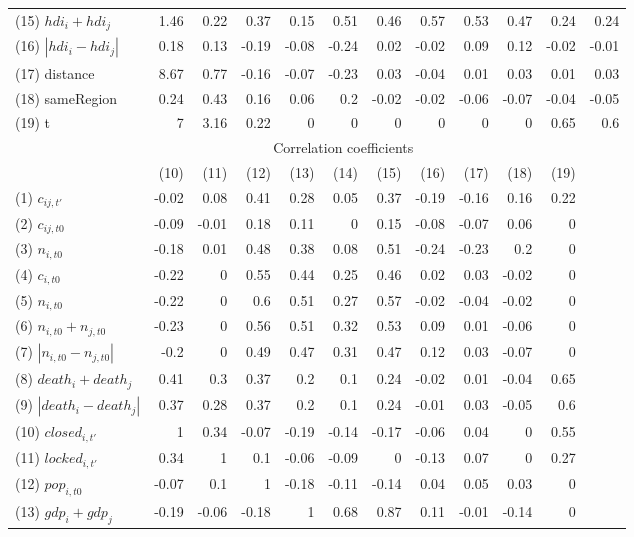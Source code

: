 \begin{landscape}
\begin{table}[ht]
\begin{threeparttable}
\begin{small}
\begin{tabular}{lrrrrrrrrrrr}
(15)	$hdi_i+hdi_j$	&	1.46	&	0.22	&	0.37	&	0.15	&	0.51	&	0.46	&	0.57	&	0.53	&	0.47	&	0.24	&	0.24	\\
(16)	$|hdi_i-hdi_j|$	&	0.18	&	0.13	&	-0.19	&	-0.08	&	-0.24	&	0.02	&	-0.02	&	0.09	&	0.12	&	-0.02	&	-0.01	\\
(17)	distance	&	8.67	&	0.77	&	-0.16	&	-0.07	&	-0.23	&	0.03	&	-0.04	&	0.01	&	0.03	&	0.01	&	0.03	\\
(18)	sameRegion	&	0.24	&	0.43	&	0.16	&	0.06	&	0.2	&	-0.02	&	-0.02	&	-0.06	&	-0.07	&	-0.04	&	-0.05	\\
(19)	t	&	7	&	3.16	&	0.22	&	0	&	0	&	0	&	0	&	0	&	0	&	0.65	&	0.6	\\
\noalign{\smallskip}\hline\noalign{\smallskip}
   & \multicolumn{9}{c}{Correlation coefficients}  \\ 
\noalign{\smallskip}\hline\noalign{\smallskip}
		&	(10)	&	(11)	&	(12)	&	(13)	&	(14)	&	(15)	&	(16)	&	(17)	&	(18)	&	(19)	\\
(1)	$c_{ij,t'}$	&	-0.02	&	0.08	&	0.41	&	0.28	&	0.05	&	0.37	&	-0.19	&	-0.16	&	0.16	&	0.22	\\
(2)	$c_{ij,t0}$	&	-0.09	&	-0.01	&	0.18	&	0.11	&	0	&	0.15	&	-0.08	&	-0.07	&	0.06	&	0	\\
(3)	$n_{i,t0}$	&	-0.18	&	0.01	&	0.48	&	0.38	&	0.08	&	0.51	&	-0.24	&	-0.23	&	0.2	&	0	\\
(4)	$c_{i,t0}$	&	-0.22	&	0	&	0.55	&	0.44	&	0.25	&	0.46	&	0.02	&	0.03	&	-0.02	&	0	\\
(5)	$n_{i,t0}$	&	-0.22	&	0	&	0.6	&	0.51	&	0.27	&	0.57	&	-0.02	&	-0.04	&	-0.02	&	0	\\
(6)	$n_{i,t0}+n_{j,t0}$	&	-0.23	&	0	&	0.56	&	0.51	&	0.32	&	0.53	&	0.09	&	0.01	&	-0.06	&	0	\\
(7)	$|n_{i,t0}-n_{j,t0}|$	&	-0.2	&	0	&	0.49	&	0.47	&	0.31	&	0.47	&	0.12	&	0.03	&	-0.07	&	0	\\
(8)	$death_i+death_j$	&	0.41	&	0.3	&	0.37	&	0.2	&	0.1	&	0.24	&	-0.02	&	0.01	&	-0.04	&	0.65	\\
(9)	$|death_i-death_j|$	&	0.37	&	0.28	&	0.37	&	0.2	&	0.1	&	0.24	&	-0.01	&	0.03	&	-0.05	&	0.6	\\
(10)	$closed_{i,t'}$	&	1	&	0.34	&	-0.07	&	-0.19	&	-0.14	&	-0.17	&	-0.06	&	0.04	&	0	&	0.55	\\
(11)	$locked_{i,t'}$	&	0.34	&	1	&	0.1	&	-0.06	&	-0.09	&	0	&	-0.13	&	0.07	&	0	&	0.27	\\
(12)	$pop_{i,t0}$	&	-0.07	&	0.1	&	1	&	-0.18	&	-0.11	&	-0.14	&	0.04	&	0.05	&	0.03	&	0	\\
(13)	$gdp_i+gdp_j$	&	-0.19	&	-0.06	&	-0.18	&	1	&	0.68	&	0.87	&	0.11	&	-0.01	&	-0.14	&	0	\\

\end{tabular}
\end{small}
\end{threeparttable}
\end{table}
\end{landscape}
